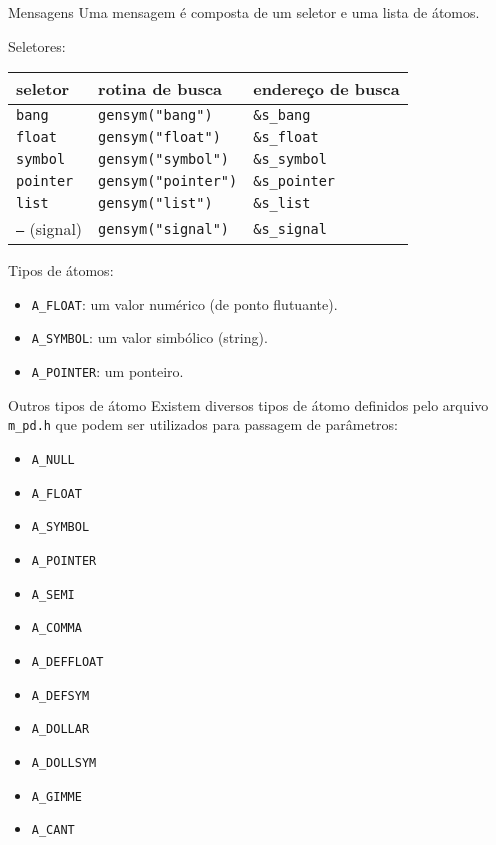 \begin{frame}{Mensagens}
Uma mensagem é composta de um seletor e uma lista de átomos.

\vspace{1em}
Seletores:

\begin{center}
\begin{tabular}{|l|l|l|}
\hline
  seletor & rotina de busca & endereço de busca \\
\hline
  \texttt{bang} & \texttt{gensym("bang")} & \texttt{\&s\_bang} \\
  \texttt{float} & \texttt{gensym("float")} & \texttt{\&s\_float} \\
  \texttt{symbol} & \texttt{gensym("symbol")} & \texttt{\&s\_symbol} \\
  \texttt{pointer} & \texttt{gensym("pointer")} & \texttt{\&s\_pointer} \\
  \texttt{list} & \texttt{gensym("list")} & \texttt{\&s\_list} \\
  \texttt{--}  (signal) & \texttt{gensym("signal")} & \texttt{\&s\_signal} \\
\hline
\end{tabular}
\end{center}

Tipos de átomos:
\begin{itemize}
\item \texttt{A\_FLOAT}: um valor numérico (de ponto flutuante).
\item \texttt{A\_SYMBOL}: um valor simbólico (string).
\item \texttt{A\_POINTER}: um ponteiro.
\end{itemize}
\end{frame}


\begin{frame}{Outros tipos de átomo}
Existem diversos tipos de átomo definidos pelo arquivo \texttt{m\_pd.h} que
podem ser utilizados para passagem de parâmetros:
\begin{itemize}
\item \texttt{A\_NULL}
\item \texttt{A\_FLOAT}
\item \texttt{A\_SYMBOL}
\item \texttt{A\_POINTER}
\item \texttt{A\_SEMI}
\item \texttt{A\_COMMA}
\item \texttt{A\_DEFFLOAT}
\item \texttt{A\_DEFSYM}
\item \texttt{A\_DOLLAR} 
\item \texttt{A\_DOLLSYM}
\item \texttt{A\_GIMME}
\item \texttt{A\_CANT}
\end{itemize}
\end{frame}
